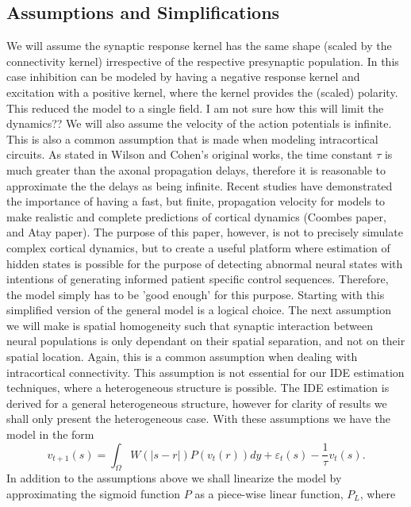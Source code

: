 \documentclass[onecolumn,draftcls]{IEEEtran}
\begin{document}
\subsection{Assumptions and Simplifications}
We will assume the synaptic response kernel has the same shape (scaled by the connectivity kernel) irrespective of the respective presynaptic population. In this case inhibition can be modeled by having a negative response kernel and excitation with a positive kernel, where the kernel provides the (scaled) polarity. This reduced the model to a single field. I am not sure how this will limit the dynamics?? We will also assume the velocity of the action potentials is infinite. This is also a common assumption that is made when modeling intracortical circuits. As stated in Wilson and Cohen's original works, the time constant $\tau$ is much greater than the axonal propagation delays, therefore it is reasonable to approximate the the delays as being infinite. Recent studies have demonstrated the importance of having a fast, but finite, propagation velocity for models to make realistic and complete predictions of cortical dynamics (Coombes paper, and Atay paper). The purpose of this paper, however, is not to precisely simulate complex cortical dynamics, but to create a useful platform where estimation of hidden states is possible for the purpose of detecting abnormal neural states with intentions of generating informed patient specific control sequences. Therefore, the model simply has to be 'good enough' for this purpose. Starting with this simplified version of the general model is a logical choice. The next assumption we will make is spatial homogeneity such that synaptic interaction between neural populations is only dependant on their spatial separation, and not on their spatial location. Again, this is a common assumption when dealing with intracortical connectivity. This assumption is not essential for our IDE estimation techniques, where a heterogeneous structure is possible. The IDE estimation is derived for a general heterogeneous structure, however for clarity of results we shall only present the heterogeneous case. With these assumptions we have the model in the form
\begin{equation}\label{Eq10}
{v_{t + 1}}\left( s \right) = \int_\Omega  {W\left( {\left| {s - r} \right|} \right)P\left( {{v_t}\left( r \right)} \right)dy}  + {\varepsilon _t}\left( s \right) - \frac{1}{\tau }{v_t}\left( s \right).
\end{equation}
In addition to the assumptions above we shall linearize the model by approximating the sigmoid function $P$ as a piece-wise linear function, $P_{L}$, where
\end{document}
